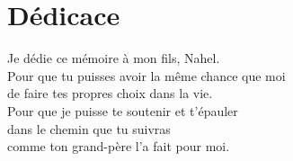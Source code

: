 \chapter*{Dédicace}
\begin{flushright}
\begin{small}

Je dédie ce mémoire à mon fils, Nahel. 
\\Pour que tu puisses avoir la même chance que moi
\\de faire tes propres choix dans la vie.
\\Pour que je puisse te soutenir et t'épauler 
\\dans le chemin que tu suivras 
\\comme ton grand-père l'a fait pour moi.

\end{small}
\end{flushright}
